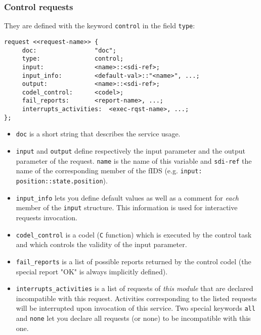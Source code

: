 \subsubsection{Control requests}

They are defined with the keyword {\tt control} in the field {\tt type}:

\begin{center}\begin{cartouche}\small\begin{verbatim}
request <<request-name>> {
     doc:                "doc";
     type:               control;
     input:              <name>::<sdi-ref>;
     input_info:         <default-val>::"<name>", ...;
     output:             <name>::<sdi-ref>;
     codel_control:      <codel>;
     fail_reports:       <report-name>, ...;
     interrupts_activities:  <exec-rqst-name>, ...;
};
\end{verbatim}\end{cartouche}\end{center}

\begin{itemize}
\item {\tt doc} is a short string that describes the service usage.

\item {\tt input} and {\tt output} define respectively the input
parameter and the output parameter of the request. {\tt name} is the name
of this variable and  {\tt sdi-ref} the name  of the corresponding member
of the fIDS (e.g. {\tt input: position::state.position}).

\item {\tt input\_info} lets you define default values as well as a
comment for {\em  each}   member  of  the  {\tt  input}  structure.  This
information is used for interactive  requests invocation.

\item {\tt codel\_control} is a codel ({\tt C} function) which is
executed by the control task and which controls the validity of the input
parameter.

\item {\tt fail\_reports} is a list of possible reports returned by the
control codel (the special report "OK" is always implicitly defined).

\item {\tt interrupts\_activities} is a list of requests of {\em this module}
that   are    declared   incompatible  with     this request.  Activities
corresponding to the listed requests will  be interrupted upon invocation
of this service.  Two special keywords {\tt  all} and {\tt none} let  you
declare all requests (or none) to be incompatible with this one.
\end{itemize}


